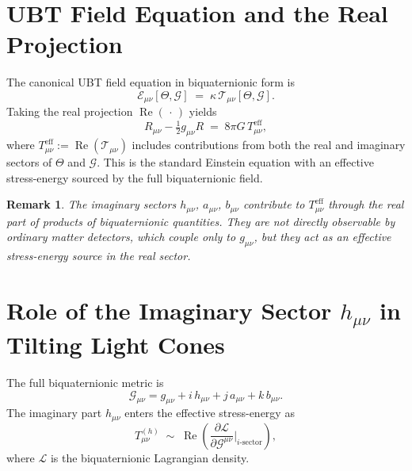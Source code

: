 \documentclass[12pt]{article}
\newtheorem{remark}{Remark}
\begin{document}
\section{UBT Field Equation and the Real Projection}
The canonical UBT field equation in biquaternionic form is
\begin{equation}
  \mathcal{E}_{\mu\nu}[\Theta,\mathcal{G}]
  \;=\; \kappa\,\mathcal{T}_{\mu\nu}[\Theta,\mathcal{G}].
  \label{eq:ubt_field_eq}
\end{equation}
Taking the real projection $\operatorname{Re}(\,\cdot\,)$ yields
\begin{equation}
  R_{\mu\nu} - \tfrac{1}{2}g_{\mu\nu}R
  \;=\; 8\pi G\,T_{\mu\nu}^{\mathrm{eff}},
  \label{eq:einstein_eff}
\end{equation}
where $T_{\mu\nu}^{\mathrm{eff}} := \operatorname{Re}(\mathcal{T}_{\mu\nu})$
includes contributions from both the real and imaginary sectors of $\Theta$
and $\mathcal{G}$.  This is the standard Einstein equation with an effective
stress-energy sourced by the full biquaternionic field.

\begin{remark}
The imaginary sectors $h_{\mu\nu}$, $a_{\mu\nu}$, $b_{\mu\nu}$ contribute
to $T_{\mu\nu}^{\mathrm{eff}}$ through the real part of products of
biquaternionic quantities.  They are not directly observable by ordinary
matter detectors, which couple only to $g_{\mu\nu}$, but they act as an
effective stress-energy source in the real sector.
\end{remark}

\section{Role of the Imaginary Sector $h_{\mu\nu}$ in Tilting Light Cones}
The full biquaternionic metric is
\begin{equation}
  \mathcal{G}_{\mu\nu} = g_{\mu\nu} + i\,h_{\mu\nu}
                        + j\,a_{\mu\nu} + k\,b_{\mu\nu}.
\end{equation}
The imaginary part $h_{\mu\nu}$ enters the effective stress-energy as
\begin{equation}
  T_{\mu\nu}^{(h)} \;\sim\; \operatorname{Re}\!\left(
    \frac{\partial \mathcal{L}}{\partial \mathcal{G}^{\mu\nu}}
    \bigg|_{i\text{-sector}}
  \right),
\end{equation}
where $\mathcal{L}$ is the biquaternionic Lagrangian density.
\end{document}

